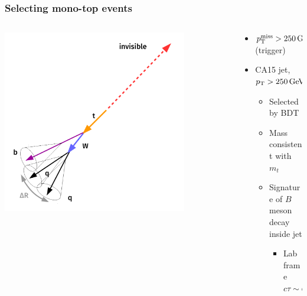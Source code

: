 \documentclass[aspectratio=169,xcolor=dvipsnames,,table,compress]{beamer}
\begin{document}
\begin{frame}[t]  \frametitle{Selecting mono-top events}
  \vspace{-5mm}
  \begin{columns}[T]
  \begin{column}{0.5\textwidth}
  \centering
    \includegraphics[width=0.8\textwidth]{../figures/talk/boosted_event.pdf}
  \end{column}
  \begin{column}{0.5\textwidth}
    \begin{itemize}
      \item $p_\text{T}^\text{miss}>250\,\text{GeV}$ (trigger)
      \item CA15 jet, $p_\text{T}>250\,\text{GeV}$
      \begin{itemize}
        \item Selected by BDT \pause
        \item Mass consistent with $m_t$
        \item Signature of $B$ meson decay inside jet
        \begin{itemize}
          \item Lab frame $c\tau \sim \mathcal{O} (\mathrm{mm})$
        \end{itemize}
      \end{itemize}
    \end{itemize}
    \centering
    \hspace{-30mm}

\end{column}
\end{columns}
\end{frame}
\end{document}
